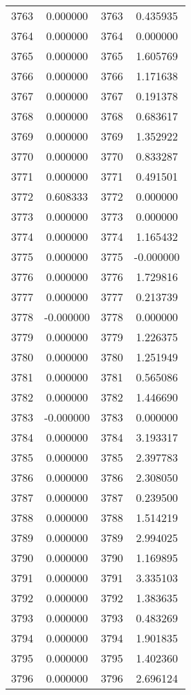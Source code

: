 \documentclass[12pt]{article}
\begin{document}
\begin{longtable}{@{}cccc@{}}
3763 & 0.000000 & 3763 & 0.435935 \\
3764 & 0.000000 & 3764 & 0.000000 \\
3765 & 0.000000 & 3765 & 1.605769 \\
3766 & 0.000000 & 3766 & 1.171638 \\
3767 & 0.000000 & 3767 & 0.191378 \\
3768 & 0.000000 & 3768 & 0.683617 \\
3769 & 0.000000 & 3769 & 1.352922 \\
3770 & 0.000000 & 3770 & 0.833287 \\
3771 & 0.000000 & 3771 & 0.491501 \\
3772 & 0.608333 & 3772 & 0.000000 \\
3773 & 0.000000 & 3773 & 0.000000 \\
3774 & 0.000000 & 3774 & 1.165432 \\
3775 & 0.000000 & 3775 & -0.000000 \\
3776 & 0.000000 & 3776 & 1.729816 \\
3777 & 0.000000 & 3777 & 0.213739 \\
3778 & -0.000000 & 3778 & 0.000000 \\
3779 & 0.000000 & 3779 & 1.226375 \\
3780 & 0.000000 & 3780 & 1.251949 \\
3781 & 0.000000 & 3781 & 0.565086 \\
3782 & 0.000000 & 3782 & 1.446690 \\
3783 & -0.000000 & 3783 & 0.000000 \\
3784 & 0.000000 & 3784 & 3.193317 \\
3785 & 0.000000 & 3785 & 2.397783 \\
3786 & 0.000000 & 3786 & 2.308050 \\
3787 & 0.000000 & 3787 & 0.239500 \\
3788 & 0.000000 & 3788 & 1.514219 \\
3789 & 0.000000 & 3789 & 2.994025 \\
3790 & 0.000000 & 3790 & 1.169895 \\
3791 & 0.000000 & 3791 & 3.335103 \\
3792 & 0.000000 & 3792 & 1.383635 \\
3793 & 0.000000 & 3793 & 0.483269 \\
3794 & 0.000000 & 3794 & 1.901835 \\
3795 & 0.000000 & 3795 & 1.402360 \\
3796 & 0.000000 & 3796 & 2.696124 \\

\end{longtable}
\end{document}
